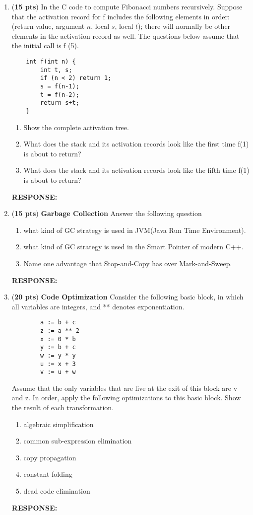 \documentclass[10pt]{article}
\newcommand {\response}{{\color{blue}\textbf{RESPONSE:}\\}}
\newcommand {\pts}[1]{({\bf #1 pts})}
\begin{document}
\begin{enumerate}

    \item \pts{15} In the C code to compute Fibonacci numbers recursively. Suppose that the 
activation record for f includes the following elements
in order: (return value, argument $n$, local $s$, local $t$); there will normally be
other elements in the activation record as well. The questions below assume
that the initial call is f (5).
    \begin{verbatim}
    int f(int n) {
        int t, s;
        if (n < 2) return 1;
        s = f(n-1);
        t = f(n-2);
        return s+t;
    }
    \end{verbatim}
\begin{enumerate}
    \item Show the complete activation tree.
    \item What does the stack and its activation records look like the first time f(1) is about to return?
    \item What does the stack and its activation records look like the fifth time f(1) is about to return?


\end{enumerate} 
\response

    \item \pts{15} \textbf{Garbage Collection} Answer the following question
    \begin{enumerate}
        \item what kind of GC strategy is used in JVM(Java Run Time Environment).
        \item what kind of GC strategy is used in the Smart Pointer of modern C++.
        \item Name one advantage that Stop-and-Copy has over Mark-and-Sweep.
    \end{enumerate}
    \response
    
    \item \pts{20} \textbf{Code Optimization} Consider the following basic block, in which all variables are integers, and 
** denotes exponentiation.
    \begin{verbatim}
        a := b + c
        z := a ** 2
        x := 0 * b
        y := b + c
        w := y * y
        u := x + 3
        v := u + w
    \end{verbatim}
    Assume that the only variables that are live at the exit of this block are v and z. In order, apply the
following optimizations to this basic block. Show the result of each transformation.
    \begin{enumerate}
        \item algebraic simplification
        \item common sub-expression elimination
        \item copy propagation
        \item constant folding
        \item dead code elimination
    \end{enumerate}
\response


\end{enumerate}
\end{document}
